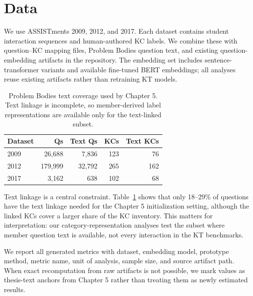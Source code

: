 \section{Data}
We use ASSISTments 2009, 2012, and 2017. Each dataset contains student interaction sequences and human-authored KC labels. We combine these with question--KC mapping files, Problem Bodies question text, and existing question-embedding artifacts in the repository. The embedding set includes sentence-transformer variants and available fine-tuned BERT embeddings; all analyses reuse existing artifacts rather than retraining KT models.

\begin{table}[t]
\centering
\small
\begin{tabular}{lrrrr}
\toprule
Dataset & Qs & Text Qs & KCs & Text KCs \\
\midrule
2009 & 26,688 & 7,836 & 123 & 76 \\
2012 & 179,999 & 32,792 & 265 & 162 \\
2017 & 3,162 & 638 & 102 & 68 \\
\bottomrule
\end{tabular}
\caption{Problem Bodies text coverage used by Chapter 5. Text linkage is incomplete, so member-derived label representations are available only for the text-linked subset.}
\label{tab:coverage}
\end{table}

Text linkage is a central constraint. Table~\ref{tab:coverage} shows that only 18--29\% of questions have the text linkage needed for the Chapter 5 initialization setting, although the linked KCs cover a larger share of the KC inventory. This matters for interpretation: our category-representation analyses test the subset where member question text is available, not every interaction in the KT benchmarks.

We report all generated metrics with dataset, embedding model, prototype method, metric name, unit of analysis, sample size, and source artifact path. When exact recomputation from raw artifacts is not possible, we mark values as thesis-text anchors from Chapter 5 rather than treating them as newly estimated results.
